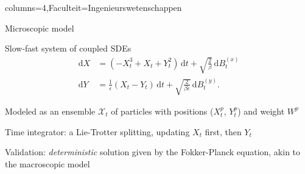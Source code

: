 \documentclass[portrait,a1paper,fontscale=0.45]{kuleuvenposter}
\newcommand{\dd}{\,\mathrm{d}}
\begin{document}
\begin{poster}{columns=4,Faculteit=Ingenieurswetenschappen}
\begin{posterbox}[name=microscopic, column=0,below=micro-macro modelling]{Microscopic model}
\begin{noindentitemize}
\item Slow-fast system of coupled SDEs
\begin{align}
\dd X &= (-X_t^3 + X_t + Y_t^2) \dd t + \sqrt{\frac{2}{\beta}} \dd B_t^{(x)}  \label{eq:xParisdyn}\\
\dd Y &= \frac{1}{\epsilon}(X_t - Y_t) \dd t + \sqrt{\frac{2}{\beta\epsilon}} \dd B_t^{(y)}. \label{eq:yParisdyn}
\end{align}
%
\item Modeled as an ensemble $\mathcal{X}_t$ of particles with positions ($X_t^p$, $Y_t^p$) and weight $W^p$
\item Time integrator: a Lie-Trotter splitting, updating $X_t$ first, then $Y_t$
\item Validation: \emph{deterministic} solution given by the Fokker-Planck equation, akin to the macroscopic model
\end{noindentitemize}
\end{posterbox}


\end{poster}
\end{document}
